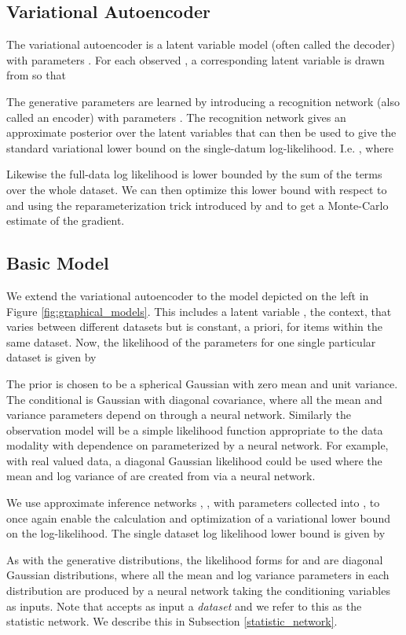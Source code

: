 \documentclass{article} \usepackage{iclr2017_conference,times}
\begin{document}
\subsection{Variational Autoencoder}
The variational autoencoder is a latent variable model  (often called the decoder) with parameters . For each observed , a corresponding latent variable  is drawn from  so that

The generative parameters  are learned by introducing a recognition network (also called an encoder)  with parameters . The recognition network gives an approximate posterior over the latent variables that can then be used to give the standard variational lower bound \citep{saul_variational} on the single-datum log-likelihood. I.e. , where

Likewise the full-data log likelihood is lower bounded by the sum of the  terms over the whole dataset. We can then optimize this lower bound with respect to  and  using the reparameterization trick introduced by \citet{variational_autoencoder} and  \citet{reparam_paper} to get a Monte-Carlo estimate of the gradient.


\subsection{Basic Model}
We extend the variational autoencoder to the model depicted on the left in Figure \ref{fig:graphical_models}. This includes a latent variable , the context, that varies between different datasets but is constant, a priori, for items within the same dataset. Now, the likelihood of the parameters  for one single particular dataset  is given by

The prior  is chosen to be a spherical Gaussian with zero mean and unit variance. The conditional  is Gaussian with diagonal covariance, where all the mean and variance parameters depend on  through a neural network. Similarly the observation model  will be a simple likelihood function appropriate to the data modality with dependence on  parameterized by a neural network. For example, with real valued data, a diagonal Gaussian likelihood could be used where the mean and log variance of  are created from  via a neural network.

We use approximate inference networks , , with parameters collected into , to once again enable the calculation and optimization of a variational lower bound on the log-likelihood. The single dataset log likelihood lower bound is given by

As with the generative distributions, the likelihood forms for  and  are diagonal Gaussian distributions, where all the mean and log variance parameters in each distribution are produced by a neural network taking the conditioning variables as inputs. Note that  accepts as input a \emph{dataset}  and we refer to this as the statistic network. We describe this in Subsection \ref{statistic_network}. 
\end{document}
